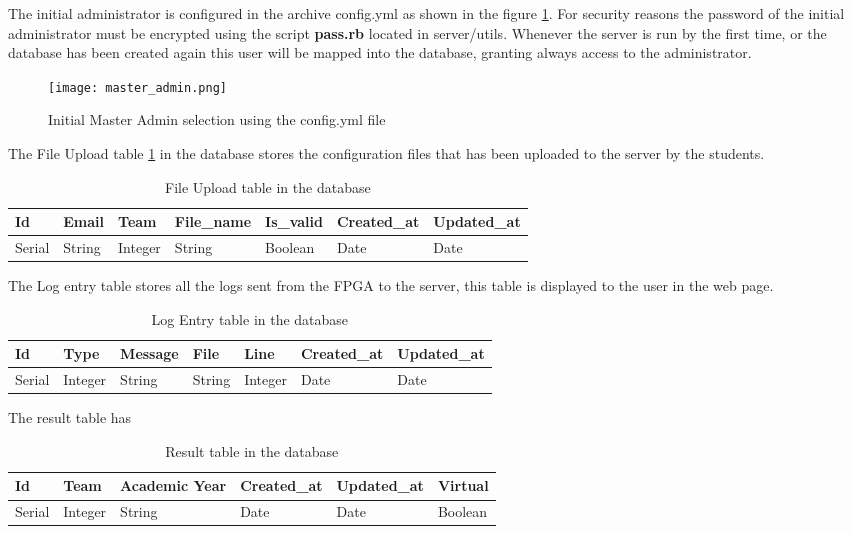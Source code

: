 The initial administrator is configured in the archive config.yml as shown in the figure \ref{fig:admin_config}. For security reasons the password of 
the initial administrator must be encrypted using the script {\bf pass.rb} located in server/utils. Whenever the server is run by the first time, or the database
has been created again this user will be mapped into the database, granting always access to the administrator. 

\begin{figure}[htb]
\centering
\texttt{[image: master\_admin.png]}
\caption{Initial Master Admin selection using the config.yml file}
\label{fig:admin_config}
\end{figure}

The File Upload table \ref{tab:file_upload_table} in the database stores the configuration files that has been uploaded to the server by the students.

\begin{table}
\centering
    \begin{tabular}{ | l | l | l | l | l | l | l |}
    \hline
    Id & Email & Team & File\_name & Is\_valid & Created\_at & Updated\_at  \\ \hline
    Serial & String & Integer & String & Boolean & Date & Date \\ \hline
    \end{tabular}
    \caption{File Upload table in the database}
    \label{tab:file_upload_table}
\end{table}

The Log entry table stores all the logs sent from the FPGA to the server, this table is displayed to the user in the web page.
\begin{table}
\centering
    \begin{tabular}{ | l | l | l | l | l | l | l |}
    \hline
    Id & Type & Message & File & Line & Created\_at & Updated\_at  \\ \hline
    Serial & Integer & String & String & Integer & Date & Date \\ \hline
    \end{tabular}
    \caption{Log Entry table in the database}
    \label{tab:log_entry_table}
\end{table}

The result table has 
\begin{table}
\centering
    \begin{tabular}{ | l | l | l | l | l | l |}
    \hline
    Id & Team & Academic Year & Created\_at & Updated\_at & Virtual  \\ \hline
    Serial & Integer & String & Date & Date & Boolean \\ \hline
    \end{tabular}
    \caption{Result table in the database}
    \label{tab:Result_table}
\end{table}

